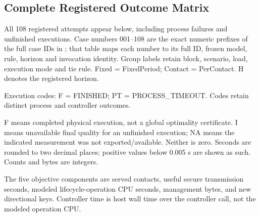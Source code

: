 \subsection{Complete Registered Outcome Matrix}

All 108 registered attempts appear below, including process failures and unfinished executions. Case numbers 001--108 are the exact numeric prefixes of the full case IDs in ; that table maps each number to its full ID, frozen model, rule, horizon and invocation identity. Group labels retain block, scenario, load, execution mode and tie rule. Fixed = FixedPeriod; Contact = PerContact. H denotes the registered horizon.

Execution codes: F = FINISHED; PT = PROCESS\_\allowbreak{}TIMEOUT. Codes retain distinct process and controller outcomes.

F means completed physical execution, not a global optimality certificate. I means unavailable final quality for an unfinished execution; NA means the indicated measurement was not exported/available. Neither is zero. Seconds are rounded to two decimal places; positive values below 0.005 s are shown as such. Counts and bytes are integers.

The five objective components are served contacts, useful secure transmission seconds, modeled lifecycle-operation CPU seconds, management bytes, and new directional keys. Controller time is host wall time over the controller call, not the modeled operation CPU.

